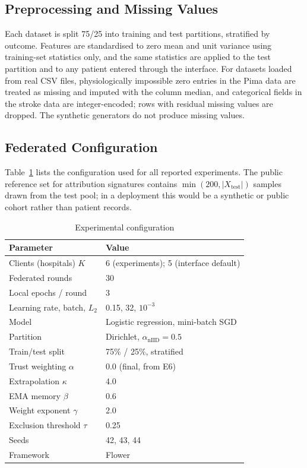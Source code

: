\documentclass[10pt,twocolumn,letterpaper]{article}
\begin{document}
\subsection{Preprocessing and Missing Values}
Each dataset is split 75/25 into training and test partitions, stratified by
outcome. Features are standardised to zero mean and unit variance using
training-set statistics only, and the same statistics are applied to the test
partition and to any patient entered through the interface. For datasets
loaded from real CSV files, physiologically impossible zero entries in the
Pima data are treated as missing and imputed with the column median, and
categorical fields in the stroke data are integer-encoded; rows with residual
missing values are dropped. The synthetic generators do not produce missing
values.

\subsection{Federated Configuration}
Table~\ref{tab:config} lists the configuration used for all reported
experiments. The public reference set for attribution signatures contains
$\min(200, |X_{\mathrm{test}}|)$ samples drawn from the test pool; in a
deployment this would be a synthetic or public cohort rather than patient
records.

\begin{table}[t]
 \caption{Experimental configuration}
 \label{tab:config}
 \centering
 \small
 \begin{tabular}{ll}
 \toprule
 Parameter & Value \\
 \midrule
 Clients (hospitals) $K$ & 6 (experiments); 5 (interface default) \\
 Federated rounds & 30 \\
 Local epochs / round & 3 \\
 Learning rate, batch, $L_2$ & 0.15, 32, $10^{-3}$ \\
 Model & Logistic regression, mini-batch SGD \\
 Partition & Dirichlet, $\alpha_{\mathrm{nIID}}=0.5$ \\
 Train/test split & 75\% / 25\%, stratified \\
 Trust weighting $\alpha$ & 0.0 (final, from E6) \\
 Extrapolation $\kappa$ & 4.0 \\
 EMA memory $\beta$ & 0.6 \\
 Weight exponent $\gamma$ & 2.0 \\
 Exclusion threshold $\tau$ & 0.25 \\
 Seeds & 42, 43, 44 \\
 Framework & Flower \\
 \bottomrule
 \end{tabular}
\end{table}
\end{document}
